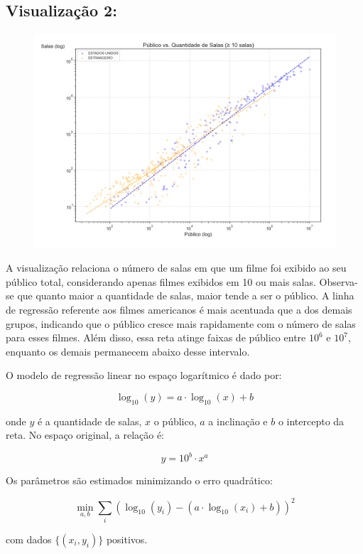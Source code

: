 \documentclass{article}
\begin{document}
\subsection*{Visualização 2:}
\begin{figure}[H]
    \centerline{\includegraphics[width = \linewidth]{img/Figure_2.png}}
\end{figure}

A visualização relaciona o número de salas em que um filme foi exibido ao seu público total, considerando apenas filmes exibidos em 10 ou mais salas. Observa-se que quanto maior a quantidade de salas, maior tende a ser o público. A linha de regressão referente aos filmes americanos é mais acentuada que a dos demais grupos, indicando que o público cresce mais rapidamente com o número de salas para esses filmes. Além disso, essa reta atinge faixas de público entre \(10^{6}\) e \(10^{7}\), enquanto os demais permanecem abaixo desse intervalo.

O modelo de regressão linear no espaço logarítmico é dado por:

\[
\log_{10}(y) = a \cdot \log_{10}(x) + b
\]

onde \(y\) é a quantidade de salas, \(x\) o público, \(a\) a inclinação e \(b\) o intercepto da reta. No espaço original, a relação é:

\[
y = 10^{b} \cdot x^{a}
\]

Os parâmetros são estimados minimizando o erro quadrático:

\[
\min_{a,b} \sum_{i} \left( \log_{10}(y_i) - (a \cdot \log_{10}(x_i) + b) \right)^2
\]

com dados \(\{(x_i,y_i)\}\) positivos.
\end{document}
